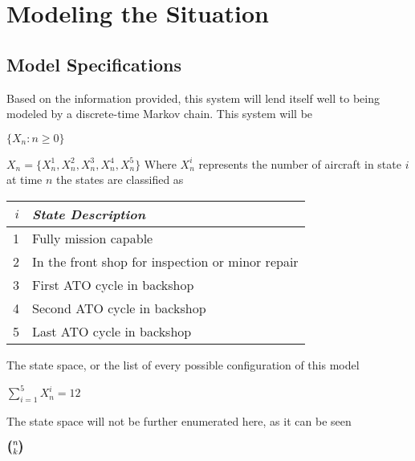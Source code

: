 \documentclass[12pt]{amsart}
\begin{document}
\section{Modeling the Situation}

\subsection{Model Specifications}

Based on the information provided, this system will lend itself well to being modeled 
by a discrete-time Markov chain.
This system will be 

\(\{X_n : n\geq0\}\)

\(X_n = \{X_n^1,X_n^2,X_n^3,X_n^4,X_n^5\}\)
Where \(X_n^i\) represents the number of aircraft in state \(i\) at time \(n\)
the states are classified as


\begin{tabular}{rl}
	\toprule
	\(i\) & \textit{State Description} \\
	\midrule
	1 & Fully mission capable \\
	2 & In the front shop for inspection or minor repair \\
	3 & First ATO cycle in backshop \\
	4 & Second ATO cycle in backshop \\
	5 & Last ATO cycle in backshop \\
	\bottomrule
\end{tabular}

The state space, or the list of every possible configuration of this model

\(\sum_{i=1}^{5}X_n^i = 12\)

The state space will not be further enumerated here, as it can be seen

\(\left( \hspace{-0.4em} \binom{n}{k} \hspace{-0.4em} \right) \)









\end{document}
